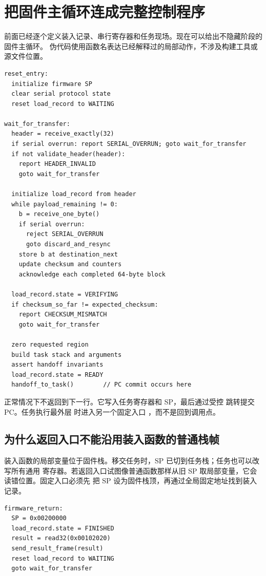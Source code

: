 \section{把固件主循环连成完整控制程序}

前面已经逐个定义装入记录、串行寄存器和任务现场。现在可以给出不隐藏阶段的固件主循环。
伪代码使用函数名表达已经解释过的局部动作，不涉及构建工具或源文件位置。

\begin{lstlisting}
reset_entry:
  initialize firmware SP
  clear serial protocol state
  reset load_record to WAITING

wait_for_transfer:
  header = receive_exactly(32)
  if serial overrun: report SERIAL_OVERRUN; goto wait_for_transfer
  if not validate_header(header):
    report HEADER_INVALID
    goto wait_for_transfer

  initialize load_record from header
  while payload_remaining != 0:
    b = receive_one_byte()
    if serial overrun:
      reject SERIAL_OVERRUN
      goto discard_and_resync
    store b at destination_next
    update checksum and counters
    acknowledge each completed 64-byte block

  load_record.state = VERIFYING
  if checksum_so_far != expected_checksum:
    report CHECKSUM_MISMATCH
    goto wait_for_transfer

  zero requested region
  build task stack and arguments
  assert handoff invariants
  load_record.state = READY
  handoff_to_task()        // PC commit occurs here
\end{lstlisting}

 正常情况下不返回到下一行。它写入任务寄存器和 SP，最后通过受控
跳转提交 PC。任务执行最外层  时进入另一个固定入口
，而不是回到调用点。

\subsection{为什么返回入口不能沿用装入函数的普通栈帧}

装入函数的局部变量位于固件栈。移交任务时，SP 已切到任务栈；任务也可以改写所有通用
寄存器。若返回入口试图像普通函数那样从旧 SP 取局部变量，它会读错位置。固定入口必须先
把 SP 设为固件栈顶，再通过全局固定地址找到装入记录。

\begin{lstlisting}
firmware_return:
  SP = 0x00200000
  load_record.state = FINISHED
  result = read32(0x00102020)
  send_result_frame(result)
  reset load_record to WAITING
  goto wait_for_transfer
\end{lstlisting}

